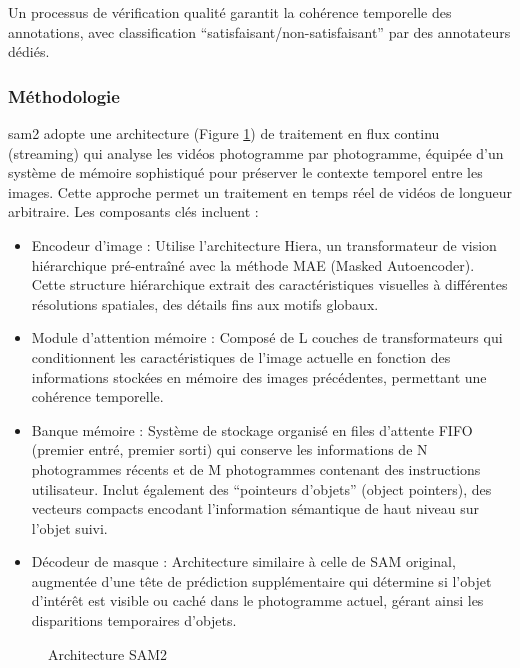 Un processus de vérification qualité garantit la cohérence temporelle des annotations, avec classification ``satisfaisant/non-satisfaisant'' par des annotateurs dédiés.

\subsubsection{Méthodologie}
\acrshort{sam2} adopte une architecture (Figure \ref{fig:ch2_sam2_11_architecture_sam2}) de traitement en flux continu (streaming) qui analyse les vidéos photogramme par photogramme, équipée d'un système de mémoire sophistiqué pour préserver le contexte temporel entre les images. Cette approche permet un traitement en temps réel de vidéos de longueur arbitraire. Les composants clés incluent :

\begin{itemize}
    \item Encodeur d'image : Utilise l'architecture Hiera, un transformateur de vision hiérarchique pré-entraîné avec la méthode MAE (Masked Autoencoder). Cette structure hiérarchique extrait des caractéristiques visuelles à différentes résolutions spatiales, des détails fins aux motifs globaux.
    
    \item Module d'attention mémoire : Composé de L couches de transformateurs qui conditionnent les caractéristiques de l'image actuelle en fonction des informations stockées en mémoire des images précédentes, permettant une cohérence temporelle.
    
    \item Banque mémoire : Système de stockage organisé en files d'attente FIFO (premier entré, premier sorti) qui conserve les informations de N photogrammes récents et de M photogrammes contenant des instructions utilisateur. Inclut également des ``pointeurs d'objets'' (object pointers), des vecteurs compacts encodant l'information sémantique de haut niveau sur l'objet suivi.
    
    \item Décodeur de masque : Architecture similaire à celle de SAM original, augmentée d'une tête de prédiction supplémentaire qui détermine si l'objet d'intérêt est visible ou caché dans le photogramme actuel, gérant ainsi les disparitions temporaires d'objets.
\end{itemize}

\begin{figure}[H]
    \centering
    \caption{Architecture SAM2 \cite{ravi_sam_2024}}
    \label{fig:ch2_sam2_11_architecture_sam2}
\end{figure}

